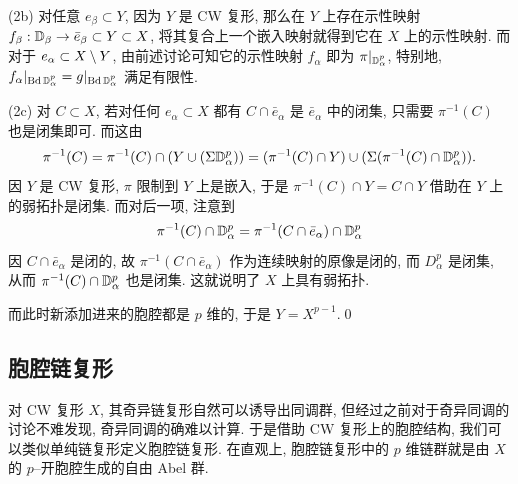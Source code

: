 \begin{Proof}
	(2b) 对任意 $ e_\beta\subset Y $, 因为 $ Y $ 是 CW 复形, 那么在 $ Y $ 上存在示性映射 $ f_\beta : \mathbb{D}_\beta\to\bar{e}_\beta\subset Y\subset X $, 将其复合上一个嵌入映射就得到它在 $ X $ 上的示性映射. 而对于 $ e_\alpha\subset X\setminus Y $, 由前述讨论可知它的示性映射 $ f_\alpha $ 即为 $ \pi|_{\mathbb{D}_\alpha^p} $, 特别地, $ f_\alpha|_{\mathrm{Bd}\,\mathbb{D}_\alpha^p}=g|_{\mathrm{Bd}\,\mathbb{D}_\alpha^p} $ 满足有限性.

	(2c) 对 $ C\subset X $, 若对任何 $ e_\alpha\subset X $ 都有 $ C\cap\bar{e}_\alpha $ 是 $ \bar{e}_\alpha $ 中的闭集, 只需要 $ \pi^{-1}(C) $ 也是闭集即可. 而这由
	\[
		\pi^{-1}(C)=\pi^{-1}(C)\cap(Y\cup(\Sigma\mathbb{D}_\alpha^p))=(\pi^{-1}(C)\cap Y)\cup(\Sigma(\pi^{-1}(C)\cap\mathbb{D}_\alpha^p)).
	\]
	因 $ Y $ 是 CW 复形, $ \pi $ 限制到 $ Y $ 上是嵌入, 于是 $ \pi^{-1}(C)\cap Y=C\cap Y $ 借助在 $ Y $ 上的弱拓扑是闭集. 而对后一项, 注意到
	\[
		\pi^{-1}(C)\cap\mathbb{D}_\alpha^p=\pi^{-1}(C\cap\bar{e}_\alpha)\cap\mathbb{D}_\alpha^p
	\]
	因 $ C\cap\bar{e}_\alpha $ 是闭的, 故 $ \pi^{-1}(C\cap\bar{e}_\alpha) $ 作为连续映射的原像是闭的, 而 $ D_\alpha^p $ 是闭集, 从而 $ \pi^{-1}(C)\cap\mathbb{D}_\alpha^p $ 也是闭集. 这就说明了 $ X $ 上具有弱拓扑.
	
	而此时新添加进来的胞腔都是 $ p $ 维的, 于是 $ Y=X^{p-1} $.\qed
\end{Proof}

\subsection{胞腔链复形}

对 CW 复形 $ X $, 其奇异链复形自然可以诱导出同调群, 但经过之前对于奇异同调的讨论不难发现, 奇异同调的确难以计算. 于是借助 CW 复形上的胞腔结构, 我们可以类似单纯链复形定义胞腔链复形. 在直观上, 胞腔链复形中的 $ p $ 维链群就是由 $ X $ 的 $ p $--开胞腔生成的自由 Abel 群.

